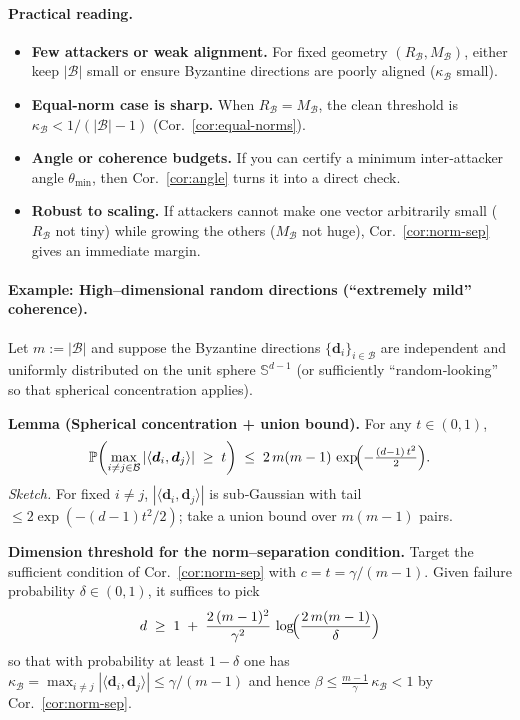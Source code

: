 \documentclass{article}
\theoremstyle{plain}
\theoremstyle{definition}
\theoremstyle{remark}
\newcommand{\vd}{\bm{d}}
\newcommand{\cB}{\mathcal{B}}
\begin{document}
\paragraph{Practical reading.}
\begin{itemize}
\item \textbf{Few attackers or weak alignment.} For fixed geometry $(R_{\cB},M_{\cB})$,
either keep $|\cB|$ small or ensure Byzantine directions are poorly aligned ($\kappa_{\cB}$ small).
\item \textbf{Equal‑norm case is sharp.} When $R_{\cB}=M_{\cB}$, the clean threshold is
$\kappa_{\cB}<1/(|\cB|-1)$ (Cor.~\ref{cor:equal-norms}).
\item \textbf{Angle or coherence budgets.}
If you can certify a minimum inter‑attacker angle $\theta_{\min}$,
then Cor.~\ref{cor:angle} turns it into a direct check.
\item \textbf{Robust to scaling.}
If attackers cannot make one vector arbitrarily small ($R_{\cB}$ not tiny)
while growing the others ($M_{\cB}$ not huge), Cor.~\ref{cor:norm-sep} gives an immediate margin.
\end{itemize}

\paragraph{Example: High–dimensional random directions (``extremely mild'' coherence).}
Let $m:=|\cB|$ and suppose the Byzantine directions $\{\vd_i\}_{i\in \cB}$ are independent and uniformly
distributed on the unit sphere $\mathbb{S}^{d-1}$ (or sufficiently “random‑looking” so that spherical
concentration applies).

\medskip
\noindent\textbf{Lemma (Spherical concentration + union bound).}
For any $t\in(0,1)$,
\[
\mathbb{P}\!\left(\max_{i\neq j\in \cB}|\langle \vd_i,\vd_j\rangle|\;\ge\;t\right)
\;\le\; 2\,m(m-1)\,\exp\!\Bigl(-\tfrac{(d-1)\,t^{2}}{2}\Bigr).
\]
\emph{Sketch.} For fixed $i\neq j$, $|\langle \vd_i,\vd_j\rangle|$ is sub‑Gaussian with tail
$\le 2\exp(-(d-1)t^2/2)$; take a union bound over $m(m-1)$ pairs.

\medskip
\noindent\textbf{Dimension threshold for the norm–separation condition.}
Target the sufficient condition of Cor.~\ref{cor:norm-sep} with $c=t=\gamma/(m-1)$.
Given failure probability $\delta\in(0,1)$, it suffices to pick
\begin{equation}
d \;\ge\; 1 \;+\; \frac{2\,(m-1)^{2}}{\gamma^{2}}\,
\log\!\Bigl(\frac{2\,m(m-1)}{\delta}\Bigr)
\label{eq:d-threshold}
\end{equation}
so that with probability at least $1-\delta$ one has
\(
\kappa_{\cB}=\max_{i\neq j}|\langle \vd_i,\vd_j\rangle|
\le \gamma/(m-1)
\)
and hence
\(
\beta \le \frac{m-1}{\gamma}\,\kappa_{\cB}<1
\)
by Cor.~\ref{cor:norm-sep}.
\end{document}
